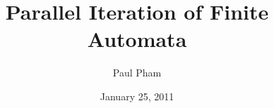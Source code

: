 \documentclass{article}
\title{Parallel Iteration of Finite Automata}
\date{January 25, 2011}
\author{Paul Pham}
\theoremstyle{plain}
\begin{document}
\newcommand{\braket}[2]{\langle #1|#2 \rangle}
\newcommand{\normtwo}{\frac{1}{\sqrt{2}}}
\newcommand{\norm}[1]{\parallel #1 \parallel}

\maketitle



















\end{document}
